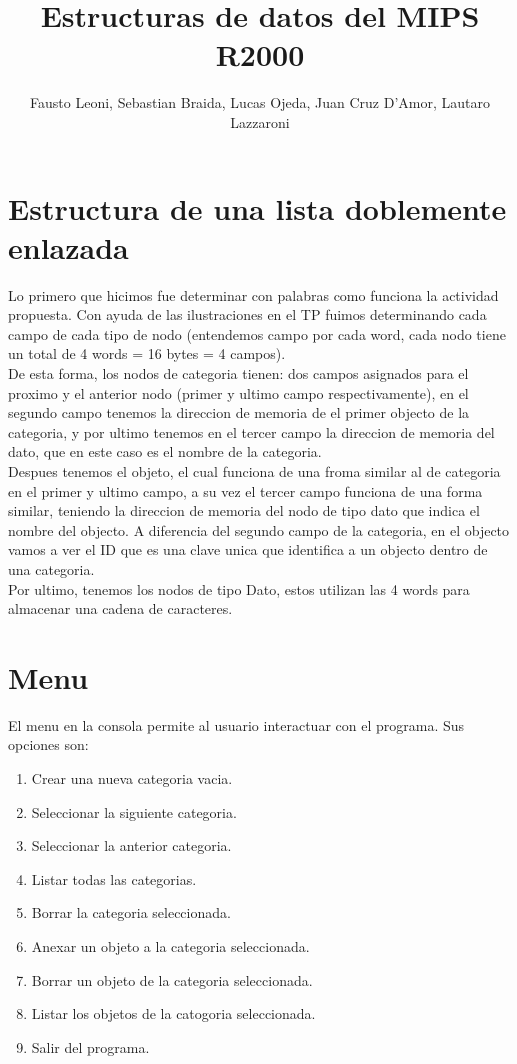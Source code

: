 \documentclass[]{article}
\title{Estructuras de datos del MIPS R2000}
\author{Fausto Leoni, Sebastian Braida, Lucas Ojeda, Juan Cruz D'Amor, Lautaro Lazzaroni}
\begin{document}
\maketitle

\section{Estructura de una lista doblemente enlazada}

Lo primero que hicimos fue determinar con palabras como funciona la actividad propuesta. Con ayuda de las ilustraciones en el TP fuimos determinando cada campo de cada tipo de nodo (entendemos campo por cada word, cada nodo tiene un total de 4 words = 16 bytes = 4 campos).\\

De esta forma, los nodos de categoria tienen: dos campos asignados para el proximo y el anterior nodo (primer y ultimo campo respectivamente), en el segundo campo tenemos la direccion de memoria de el primer objecto de la categoria, y por ultimo tenemos en el tercer campo la direccion de memoria del dato, que en este caso es el nombre de la categoria. \\

Despues tenemos el objeto, el cual funciona de una froma similar al de categoria en el primer y ultimo campo, a su vez el tercer campo funciona de una forma similar, teniendo la direccion de memoria del nodo de tipo dato que indica el nombre del objecto. A diferencia del segundo campo de la categoria, en el objecto vamos a ver el ID que es una clave unica que identifica a un objecto dentro de una categoria. \\

Por ultimo, tenemos los nodos de tipo Dato, estos utilizan las 4 words para almacenar una cadena de caracteres.

\section{Menu}
El menu en la consola permite al usuario interactuar con el programa. Sus opciones son:

\begin {enumerate}
\item Crear una nueva categoria vacia.
\item Seleccionar la siguiente categoria.
\item Seleccionar la anterior categoria.
\item Listar todas las categorias.
\item Borrar la categoria seleccionada.
\item Anexar un objeto a la categoria seleccionada.
\item Borrar un objeto de la categoria seleccionada.
\item Listar los objetos de la catogoria seleccionada.
\item Salir del programa.
\end{enumerate}
\end{document}
